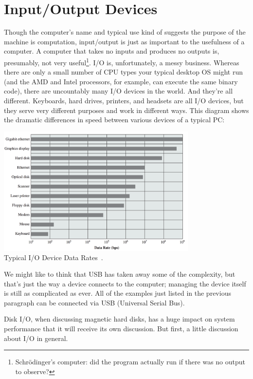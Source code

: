 




\section*{Input/Output Devices}
Though the computer's name and typical use kind of suggests the purpose of the machine is computation, input/output is just as important to the usefulness of a computer. A computer that takes no inputs and produces no outputs is, presumably, not very useful\footnote{Schr\"odinger's computer: did the program actually run if there was no output to observe?}. I/O is, unfortunately, a messy business. Whereas there are only a small number of CPU types your typical desktop OS might run (and the AMD and Intel processors, for example, can execute the same binary code), there are uncountably many I/O devices in the world. And they're all different. Keyboards, hard drives, printers, and headsets are all I/O devices, but they serve very different purposes and work in different ways. This diagram shows the dramatic differences in speed between various devices of a typical PC:

\begin{center}
	\includegraphics[width=0.75\textwidth]{images/io-device-rates.png}\\
	Typical I/O Device Data Rates~\cite{osi}.
\end{center}

We might like to think that USB has taken away some of the complexity, but that's just the way a device connects to the computer; managing the device itself is still as complicated as ever. All of the examples just listed in the previous paragraph can be connected via USB (Universal Serial Bus). 

Disk I/O, when discussing magnetic hard disks, has a huge impact on system performance that it will receive its own discussion. But first, a little discussion about I/O in general.

